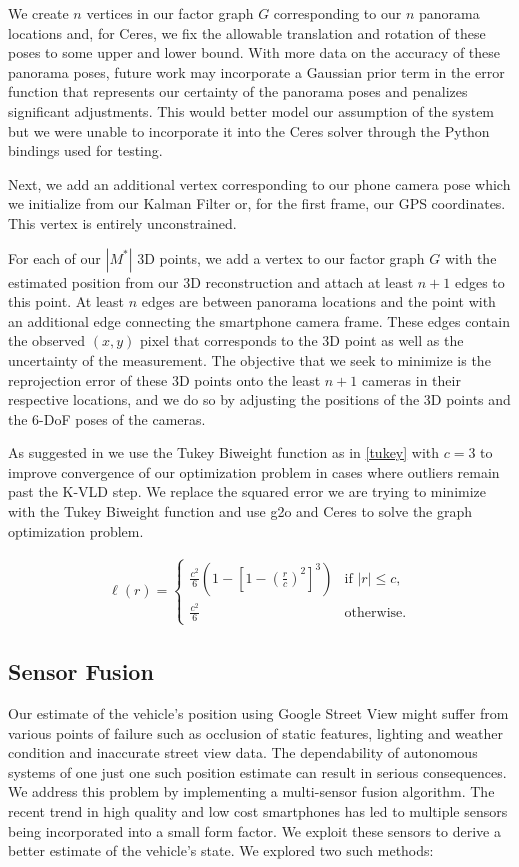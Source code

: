 \documentclass[conference]{IEEEtran}
\begin{document}
We create $n$ vertices in our factor graph $G$ corresponding to our $n$ panorama locations and, for Ceres, we fix the allowable translation and rotation of these poses to some upper and lower bound. With more data on the accuracy of these panorama poses, future work may incorporate a Gaussian prior term in the error function that represents our certainty of the panorama poses and penalizes significant adjustments. This would better model our assumption of the system but we were unable to incorporate it into the Ceres solver through the Python bindings used for testing.

Next, we add an additional vertex corresponding to our phone camera pose which we initialize from our Kalman Filter or, for the first frame, our GPS coordinates. This vertex is entirely unconstrained.

For each of our $|M^*|$ 3D points, we add a vertex to our factor graph $G$ with the estimated position from our 3D reconstruction and attach at least $n + 1$ edges to this point. At least $n$ edges are between panorama locations and the point with an additional edge connecting the smartphone camera frame. These edges contain the observed $(x,y)$ pixel that corresponds to the 3D point as well as the uncertainty of the measurement. The objective that we seek to minimize is the reprojection error of these 3D points onto the least $n + 1$ cameras in their respective locations, and we do so by adjusting the positions of the 3D points and the 6-DoF poses of the cameras.

As suggested in \cite{msthesis} we use the Tukey Biweight function as in \eqref{tukey} with $c = 3$ to improve convergence of our optimization problem in cases where outliers remain past the K-VLD step. We replace the squared error we are trying to minimize with the Tukey Biweight function and use g2o and Ceres to solve the graph optimization problem.

\begin{equation}
\begin{aligned} \ell (r) = \begin{cases} \frac{c^2}{6} \left(1 - \left[ 1 - \left( \frac{r}{c}\right)^2 \right]^3 \right) &\text{if } |r| \leq c, \\ \frac{c^2}{6} &\text{otherwise}. \end{cases} \end{aligned} \label{tukey}
\end{equation}

\subsection{Sensor Fusion}
Our estimate of the vehicle’s position using Google Street View might suffer from various points of failure such as occlusion of static features, lighting and weather condition and inaccurate street view data. The dependability of autonomous systems of one just one such position estimate can result in serious consequences. We address this problem by implementing a multi-sensor fusion algorithm. The recent trend in high quality and low cost smartphones has led to multiple sensors being incorporated into a small form factor. We exploit these sensors to derive a better estimate of the vehicle's state. We explored two such methods:
\end{document}
